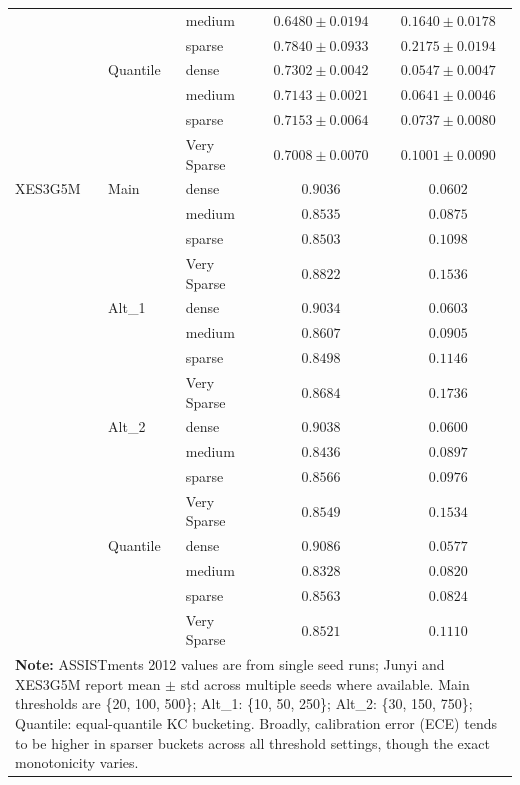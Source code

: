 \begin{table}[H]
{\begin{tabular}{lllcc}
 &  & medium & $0.6480 \pm 0.0194$ & $0.1640 \pm 0.0178$ \\
 &  & sparse & $0.7840 \pm 0.0933$ & $0.2175 \pm 0.0194$ \\
 & Quantile & dense & $0.7302 \pm 0.0042$ & $0.0547 \pm 0.0047$ \\
 &  & medium & $0.7143 \pm 0.0021$ & $0.0641 \pm 0.0046$ \\
 &  & sparse & $0.7153 \pm 0.0064$ & $0.0737 \pm 0.0080$ \\
 &  & Very Sparse & $0.7008 \pm 0.0070$ & $0.1001 \pm 0.0090$ \\
\midrule
XES3G5M & Main & dense & $0.9036$ & $0.0602$ \\
 &  & medium & $0.8535$ & $0.0875$ \\
 &  & sparse & $0.8503$ & $0.1098$ \\
 &  & Very Sparse & $0.8822$ & $0.1536$ \\
 & Alt\_1 & dense & $0.9034$ & $0.0603$ \\
 &  & medium & $0.8607$ & $0.0905$ \\
 &  & sparse & $0.8498$ & $0.1146$ \\
 &  & Very Sparse & $0.8684$ & $0.1736$ \\
 & Alt\_2 & dense & $0.9038$ & $0.0600$ \\
 &  & medium & $0.8436$ & $0.0897$ \\
 &  & sparse & $0.8566$ & $0.0976$ \\
 &  & Very Sparse & $0.8549$ & $0.1534$ \\
 & Quantile & dense & $0.9086$ & $0.0577$ \\
 &  & medium & $0.8328$ & $0.0820$ \\
 &  & sparse & $0.8563$ & $0.0824$ \\
 &  & Very Sparse & $0.8521$ & $0.1110$ \\
\bottomrule
\multicolumn{5}{p{14cm}}{\scriptsize \textbf{Note:} ASSISTments 2012 values are from single seed runs; Junyi and XES3G5M report mean $\pm$ std across multiple seeds where available. Main thresholds are \{20, 100, 500\}; Alt\_1: \{10, 50, 250\}; Alt\_2: \{30, 150, 750\}; Quantile: equal-quantile KC bucketing. Broadly, calibration error (ECE) tends to be higher in sparser buckets across all threshold settings, though the exact monotonicity varies.} \\
\end{tabular}%
}
\end{table}
